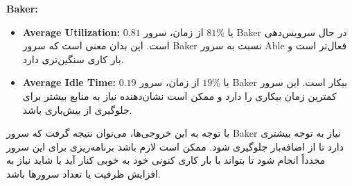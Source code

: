 \textbf{Baker:}
\begin{itemize}
	\item \textbf{Average Utilization:} \(0.81\) یا \(81\%\) از زمان، سرور Baker در حال سرویس‌دهی است. این بدان معنی است که سرور Baker نسبت به سرور Able فعال‌تر است و بار کاری سنگین‌تری دارد.
	\item \textbf{Average Idle Time:} \(0.19\) یا \(19\%\) از زمان، سرور Baker بیکار است. این سرور کمترین زمان بیکاری را دارد و ممکن است نشان‌دهنده نیاز به منابع بیشتر برای جلوگیری از بیش‌باری باشد.
\end{itemize}

با توجه به این خروجی‌ها، می‌توان نتیجه گرفت که سرور Baker نیاز به توجه بیشتری دارد تا از اضافه‌بار جلوگیری شود. ممکن است لازم باشد برنامه‌ریزی برای این سرور مجدداً انجام شود تا بتواند با بار کاری کنونی خود به خوبی کنار آید یا شاید نیاز به افزایش ظرفیت یا تعداد سرورها باشد.
